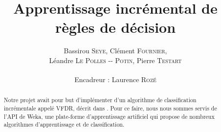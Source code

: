 \documentclass[a4paper,11pt]{article}
\title{ \textbf{Apprentissage incrémental de règles de décision} }
\author{Bassirou \textsc{Seye}, Clément \textsc{Fournier}, \\
        Léandre \textsc{Le Polles -{}- Potin}, Pierre \textsc{Testart} \\
        \\
        Encadreur : Laurence \textsc{Rozé}}
\date{}                    %
\begin{document}
          

    \maketitle                 %
    \thispagestyle{empty}      %

    \begin{abstract}
        Notre projet avait pour but d'implémenter d'un algorithme de classification incrémentale appelé VFDR, décrit dans \cite{Gama-VFDR}. Pour ce faire, nous nous sommes servis de l’API de Weka, une plate-forme d'apprentissage artificiel qui propose de nombreux algorithmes d'apprentissage et de classification. 
    \end{abstract} 

    
    
    

    \nocite{*}
    
\end{document}
